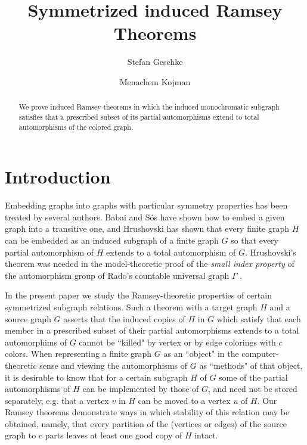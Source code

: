 \documentclass[11pt]{amsart}
\title{Symmetrized induced Ramsey Theorems}
\author{Stefan Geschke}
\author{Menachem Kojman}
\begin{document}
\maketitle

\begin{abstract} We prove induced Ramsey theorems in which the induced
monochromatic subgraph satisfies that a prescribed subset of its
partial
automorphisms extend to total automorphisms of the colored graph.
\end{abstract}

\section{Introduction}


Embedding graphs into graphs with particular symmetry properties has
been
treated by several authors. Babai and S\'os \cite{BS} have shown how
to
embed a given graph into a transitive one, and Hrushovski \cite{H} has
shown that every finite graph $H$ can be embedded as an induced
subgraph
of a finite graph $G$ so that every partial automorphism of $H$
extends
to a total automorphism of $G$. Hrushovski's theorem was needed
in the model-theoretic proof of the \emph{small index property} of the
automorphism group of Rado's
countable universal graph $\Gamma$ \cite{HHLS}.

In the present paper we study the Ramsey-theoretic properties of
certain
symmetrized subgraph relations. Such a theorem with a target graph $H$
and
a source graph $G$ asserts that the induced copies of $H$ in $G$ which
satisfy that each member in a prescribed subset of their partial
automorphisms extends to a total automorphims of $G$ cannot be
``killed" by
vertex or by edge colorings with $c$ colors. When representing a
finite
graph $G$ as an ``object" in the computer-theoretic sense and viewing
the
automorphisms of $G$ as ``methods" of that object, it is desirable to
know
that for a certain subgraph $H$ of $G$ some of the partial
automorphisms
of $H$ can be implemented by those of $G$, and need not be stored
separately, e.g. that a vertex $v$ in $H$ can be moved to a vertex $u$
of
$H$. Our Ramsey theorems demonstrate ways in which stability
of this relation may be obtained, namely, that every partition of the
(vertices or edges) of the source graph to $c$ parts leaves at
least one good copy of $H$ intact.
\end{document}
